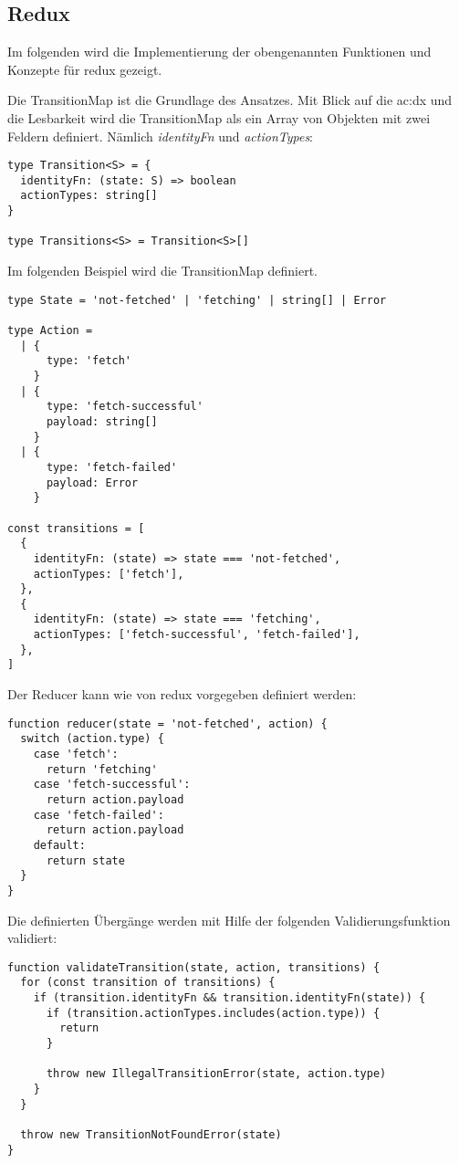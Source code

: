 \subsection{Redux}

Im folgenden wird die Implementierung der obengenannten Funktionen und Konzepte für redux gezeigt.

Die TransitionMap ist die Grundlage des Ansatzes. Mit Blick auf die \acrlong{ac:dx} und die Lesbarkeit wird die TransitionMap als ein Array von Objekten mit zwei Feldern definiert. Nämlich \textit{identityFn} und \textit{actionTypes}:

\begin{lstlisting}
type Transition<S> = {
  identityFn: (state: S) => boolean
  actionTypes: string[]
}
  
type Transitions<S> = Transition<S>[]
\end{lstlisting}

Im folgenden Beispiel wird die TransitionMap definiert.

\begin{lstlisting}
type State = 'not-fetched' | 'fetching' | string[] | Error

type Action =
  | {
      type: 'fetch'
    }
  | {
      type: 'fetch-successful'
      payload: string[]
    }
  | {
      type: 'fetch-failed'
      payload: Error
    }
  
const transitions = [
  {
    identityFn: (state) => state === 'not-fetched',
    actionTypes: ['fetch'],
  },
  {
    identityFn: (state) => state === 'fetching',
    actionTypes: ['fetch-successful', 'fetch-failed'],
  },
]
\end{lstlisting}

Der Reducer kann wie von redux vorgegeben definiert werden:

\begin{lstlisting}
function reducer(state = 'not-fetched', action) {
  switch (action.type) {
    case 'fetch':
      return 'fetching'
    case 'fetch-successful':
      return action.payload
    case 'fetch-failed':
      return action.payload
    default:
      return state
  }
}
\end{lstlisting}

Die definierten Übergänge werden mit Hilfe der folgenden Validierungsfunktion validiert:

\begin{lstlisting}
function validateTransition(state, action, transitions) {
  for (const transition of transitions) {
    if (transition.identityFn && transition.identityFn(state)) {
      if (transition.actionTypes.includes(action.type)) {
        return
      }
  
      throw new IllegalTransitionError(state, action.type)
    }
  }
  
  throw new TransitionNotFoundError(state)
}
\end{lstlisting}


